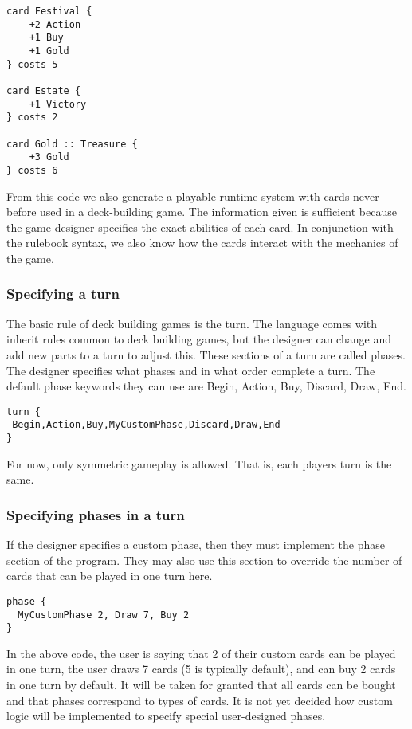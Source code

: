 \documentclass{acm_proc_article-sp}
\begin{document}
\begin{verbatim}
card Festival {
    +2 Action
    +1 Buy
    +1 Gold
} costs 5

card Estate {
    +1 Victory
} costs 2

card Gold :: Treasure {
    +3 Gold
} costs 6
\end{verbatim}

From this code we also generate a playable runtime system with cards never before
used in a deck-building game. The information given is sufficient because the
game designer specifies the exact abilities of each card. In conjunction with the
rulebook syntax, we also know how the cards interact with the mechanics of the game.

\subsubsection{Specifying a turn}
The basic rule of deck building games is the turn. The language comes with
inherit rules common to deck building games, but the designer can change and
add new parts to a turn to adjust this. These sections of a turn are called
phases. The designer specifies what phases and in what order complete a turn.
The default phase keywords they can use are Begin, Action, Buy, Discard, Draw,
End. 
\begin{verbatim}
turn {
 Begin,Action,Buy,MyCustomPhase,Discard,Draw,End 
}
\end{verbatim}

For now, only symmetric gameplay is allowed. That is, each players turn is the same.

\subsubsection{Specifying phases in a turn}
If the designer specifies a custom phase, then they must implement the phase
section of the program. They may also use this section to override the number
of cards that can be played in one turn here.

\begin{verbatim}
phase {
  MyCustomPhase 2, Draw 7, Buy 2
}
\end{verbatim}
In the above code, the user is saying that 2 of their custom cards can be
played in one turn, the user draws 7 cards (5 is typically default), and can
buy 2 cards in one turn by default. It will be taken for granted that all cards
can be bought and that phases correspond to types of cards. It is not yet
decided how custom logic will be implemented to specify special user-designed
phases.
\end{document}
